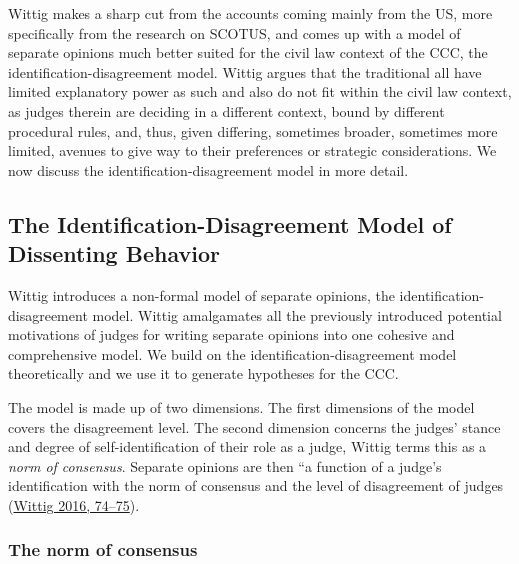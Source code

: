 \documentclass[
  11pt,
]{article}
\begin{document}
Wittig makes a sharp cut from the accounts coming mainly from the US,
more specifically from the research on SCOTUS, and comes up with a model
of separate opinions much better suited for the civil law context of the
CCC, the identification-disagreement model. Wittig argues that the
traditional all have limited explanatory power as such and also do not
fit within the civil law context, as judges therein are deciding in a
different context, bound by different procedural rules, and, thus, given
differing, sometimes broader, sometimes more limited, avenues to give
way to their preferences or strategic considerations. We now discuss the
identification-disagreement model in more detail.

\hypertarget{the-identification-disagreement-model-of-dissenting-behavior}{%
\subsection{The Identification-Disagreement Model of Dissenting
Behavior}\label{the-identification-disagreement-model-of-dissenting-behavior}}

Wittig introduces a non-formal model of separate opinions, the
identification-disagreement model. Wittig amalgamates all the previously
introduced potential motivations of judges for writing separate opinions
into one cohesive and comprehensive model. We build on the
identification-disagreement model theoretically and we use it to
generate hypotheses for the CCC.

The model is made up of two dimensions. The first dimensions of the
model covers the disagreement level. The second dimension concerns the
judges' stance and degree of self-identification of their role as a
judge, Wittig terms this as a \emph{norm of consensus}. Separate
opinions are then ``a function of a judge's identification with the norm
of consensus and the level of disagreement of judges
(\protect\hyperlink{ref-wittigOccurrenceSeparateOpinions2016}{Wittig
2016, 74--75}).

\hypertarget{the-norm-of-consensus}{%
\subsubsection{The norm of consensus}\label{the-norm-of-consensus}}
\end{document}
